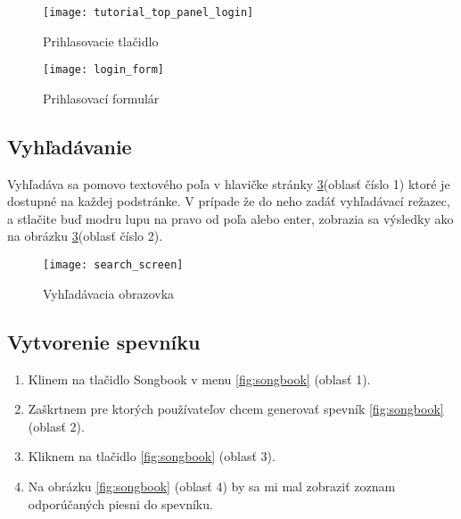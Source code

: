 \begin{figure}
    \begin{center}
        \texttt{[image: tutorial\_top\_panel\_login]}
        \caption{Prihlasovacie tlačidlo}
        \label{fig:login_button}
    \end{center}
\end{figure}

\begin{figure}
    \begin{center}
        \texttt{[image: login\_form]}
        \caption{Prihlasovací formulár}
        \label{fig:login_form}
    \end{center}
\end{figure}

\subsection{Vyhľadávanie}\label{sec:search}

Vyhľadáva sa pomovo textového poľa v hlavičke stránky \ref{fig:search_screen}(oblasť číslo 1)
ktoré je dostupné na každej podstránke. V prípade že do neho zadáť vyhľadávací režazec, a
stlačite buď modru lupu na pravo od poľa alebo enter, zobrazia sa výsledky ako na obrázku
\ref{fig:search_screen}(oblasť číslo 2).

\begin{figure}
    \begin{center}
        \texttt{[image: search\_screen]}
        \caption{Vyhľadávacia obrazovka}
        \label{fig:search_screen}
    \end{center}
\end{figure}

\subsection{Vytvorenie spevníku}

\begin{enumerate}
\item{Klinem na tlačidlo Songbook v menu \ref{fig:songbook} (oblasť 1).}
\item{Zaškrtnem pre ktorých používateľov chcem generovať spevník \ref{fig:songbook} (oblasť 2).}
\item{Kliknem na tlačidlo  \ref{fig:songbook} (oblasť 3).}
\item{Na obrázku \ref{fig:songbook} (oblasť 4) by sa mi mal zobraziť zoznam odporúčaných
    piesni do spevníku.}
\end{enumerate}

